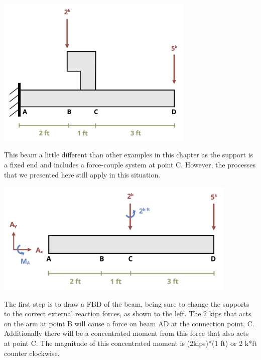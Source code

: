 \documentclass[
  letterpaper,
  DIV=11,
  numbers=noendperiod]{scrreprt}
\begin{document}
\begin{tcolorbox}[enhanced jigsaw, colbacktitle=quarto-callout-note-color!10!white, title={Example 7.4: Draw the shear and moment for the beam shown}, coltitle=black, leftrule=.75mm, rightrule=.15mm, opacityback=0, breakable, colframe=quarto-callout-note-color-frame, left=2mm, arc=.35mm, colback=white, bottomrule=.15mm, bottomtitle=1mm, toptitle=1mm, titlerule=0mm, opacitybacktitle=0.6, toprule=.15mm]

\begin{center}
\includegraphics[width=3.70833in,height=\textheight]{images/CH7 PNGs/example 7.4 part 1.png}
\end{center}

This beam a little different than other examples in this chapter as the
support is a fixed end and includes a force-couple system at point C.
However, the processes that we presented here still apply in this
situation.

\begin{center}
\includegraphics[width=4.5625in,height=\textheight]{images/CH7 PNGs/example 7.4 part 2.png}
\end{center}

The first step is to draw a FBD of the beam, being sure to change the
supports to the correct external reaction forces, as shown to the left.
The 2 kips that acts on the arm at point B will cause a force on beam AD
at the connection point, C. Additionally there will be a concentrated
moment from this force that also acts at point C. The magnitude of this
concentrated moment is (2kips)*(1 ft) or 2 k*ft counter clockwise.


\end{tcolorbox}
\end{document}

